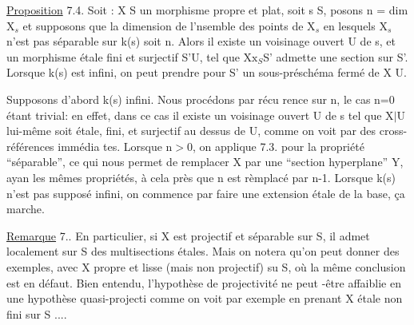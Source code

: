 

\uline{Proposition} 7.4. Soit : X \hand{$\longrightarrow$} S un morphisme propre et plat, 
soit s \hand{$\in$} S,  posons n = dim X$_{s}$ et supposons que la dimension de
l'nsemble des points de X$_{s}$ en lesquels X$_{s}$ n'est pas séparable sur k(s)
soit \hand{$<$} n. Alors il existe un voisinage ouvert U de s, et un morphisme
étale fini et surjectif S'\hand{$\longrightarrow$}U, tel que X$\mathrm{x}_{S}$S' admette une section sur S'.
Lorsque k(s) est infini, on peut prendre pour S' un sous-préschéma fermé
de X U.

Supposons d'abord k(s) infini. Nous  procédons par récu%
rence sur n, le cas n=0 étant trivial: en effet, dans ce cas il existe
un voisinage ouvert U de s tel que X$|$U lui-même soit étale, fini, et
surjectif au dessus de U, comme on voit par des cross-références immédia
tes. Lorsque n$>$0, on applique 7.3. pour la propriété ``séparable'', ce qui
nous permet de  remplacer X par une ``section hyperplane'' Y, ayan
les mêmes propriétés, à cela près que n est rèmplacé par n-1. Lorsque
k(s) n'est pas supposé infini, on commence par faire une extension étale
de la base, ça marche.

\uline{Remarque} 7.. En particulier, si X est projectif et séparable sur S,
il admet localement sur S des multisections étales. Mais on notera qu'on
peut donner des exemples, avec X propre et lisse (mais non projectif) su
S, où la même conclusion est en défaut. Bien entendu, l'hypothèse de
 projectivité ne peut -être affaiblie  en une hypothèse quasi-projecti
comme on voit par exemple en prenant X étale non fini sur S ....


